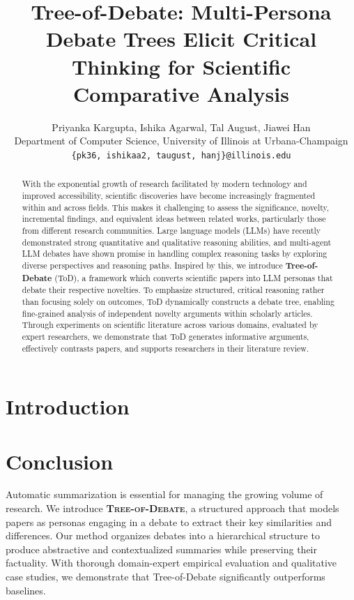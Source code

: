 \documentclass[11pt,dvipsnames]{article}
\title{Tree-of-Debate: Multi-Persona Debate Trees Elicit Critical Thinking for Scientific Comparative Analysis}
\author{Priyanka Kargupta, Ishika Agarwal, Tal August, Jiawei Han\\
  Department of Computer Science, University of Illinois at Urbana-Champaign\\
  \texttt{\{pk36, ishikaa2, taugust, hanj\}@illinois.edu} \\
}
\begin{document}
\maketitle


\begin{abstract}
With the exponential growth of research facilitated by modern technology and improved accessibility, scientific discoveries have become increasingly fragmented within and across fields. This makes it challenging to assess the significance, novelty, incremental findings, and equivalent ideas between related works, particularly those from different research communities. Large language models (LLMs) have recently demonstrated strong quantitative and qualitative reasoning abilities, and multi-agent LLM debates have shown promise in handling complex reasoning tasks by exploring diverse perspectives and reasoning paths. Inspired by this, we introduce \textbf{Tree-of-Debate} (ToD), a framework which converts scientific papers into LLM personas that debate their respective novelties. To emphasize structured, critical reasoning rather than focusing solely on outcomes, ToD dynamically constructs a debate tree, enabling fine-grained analysis of independent novelty arguments within scholarly articles. Through experiments on scientific literature across various domains, evaluated by expert researchers, we demonstrate that ToD generates informative arguments, effectively contrasts papers, and supports researchers in their literature review.
\end{abstract}

\section{Introduction}








\section{Conclusion}
Automatic summarization is essential for managing the growing volume of research. We introduce \textbf{\textsc{Tree-of-Debate}}, a structured approach that models papers as personas engaging in a debate to extract their key similarities and differences. Our method organizes debates into a hierarchical structure to produce abstractive and contextualized summaries while preserving their factuality. With thorough domain-expert empirical evaluation and qualitative case studies, we demonstrate that Tree-of-Debate significantly outperforms baselines.
\end{document}
